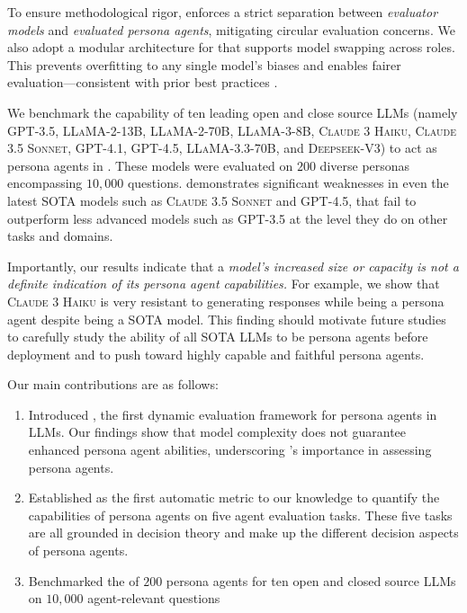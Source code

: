 To ensure methodological rigor, \benchmark enforces a strict separation between \textit{evaluator models} and \textit{evaluated persona agents}, mitigating circular evaluation concerns.
We also adopt a modular architecture for \benchmark that supports model swapping across roles. 
This prevents overfitting to any single model’s biases and enables fairer evaluation—consistent with prior best practices \citep{selfrefine, self-instruct, schick2023toolformer}.

We benchmark the capability of ten leading open and close source LLMs (namely \textsc{GPT-3.5}, \textsc{LLaMA-2-13B}, \textsc{LLaMA-2-70B}, \textsc{LLaMA-3-8B}, \textsc{Claude 3 Haiku}, \textsc{Claude 3.5 Sonnet}, \textsc{GPT-4.1}, \textsc{GPT-4.5}, \textsc{LLaMA-3.3-70B}, and \textsc{Deepseek-V3}) to act as persona agents in \benchmark.
These models were evaluated on $200$ diverse personas encompassing $10,000$ questions.
\benchmark demonstrates significant weaknesses in even the latest SOTA models such as \textsc{Claude 3.5 Sonnet} and \textsc{GPT-4.5}, that fail to outperform less advanced models such as \textsc{GPT-3.5} at the level they do on other tasks and domains. 

Importantly, our results indicate that a \textit{model's increased size or capacity is not a definite indication of its persona agent capabilities.}
For example, we show that \textsc{Claude 3 Haiku} is very resistant to generating responses while being a persona agent despite being a SOTA model.
This finding should motivate future studies to carefully study the ability of all SOTA LLMs to be persona agents before deployment and to push toward highly capable and faithful persona agents. 

Our main contributions are as follows:
\begin{enumerate}
    \item Introduced \textbf{\benchmark}, the first dynamic evaluation framework for persona agents in LLMs. Our findings show that model complexity does not guarantee enhanced persona agent abilities, underscoring \benchmark's importance in assessing persona agents. 
    \item Established \textbf{\score} as the first automatic metric to our knowledge to quantify the capabilities of persona agents on five agent evaluation tasks. These five tasks are all grounded in decision theory and make up the different decision aspects of persona agents.
    \item Benchmarked the \textbf{\score} of $200$ persona agents for ten open and closed source LLMs on $10,000$ agent-relevant questions
\end{enumerate}

